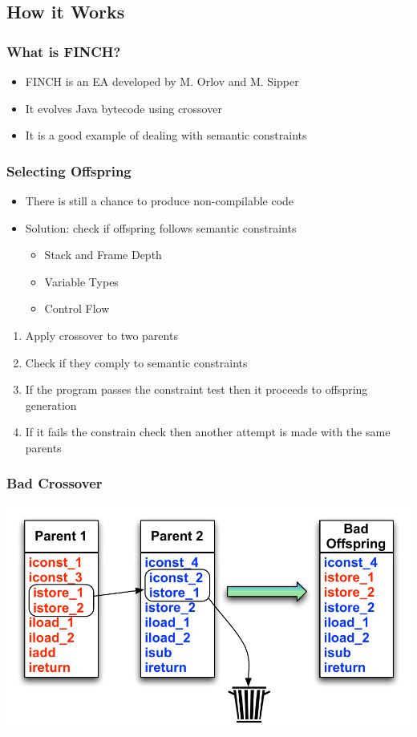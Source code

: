 \documentclass{beamer}
\begin{document}
\subsection[How it works]{How it Works}
\begin{frame}
	\frametitle{What is FINCH?}
	\begin{itemize}
		\item FINCH is an EA developed by M. Orlov and M. Sipper	
		\item It evolves Java bytecode using crossover
		\item It is a good example of dealing with semantic constraints
	\end{itemize}
\end{frame}

\begin{frame}
  \frametitle{Selecting Offspring}

  \begin{itemize}
  	\item There is still a chance to produce non-compilable code
	\item Solution: check if offspring follows semantic constraints
	\begin{itemize}
	\item Stack and Frame Depth
	\item Variable Types
	\item Control Flow
	\end{itemize}

  \end{itemize}
\end{frame}

\begin{frame}
\begin{enumerate}
\item Apply crossover to two parents
\item Check if they comply to semantic constraints
\item If the program passes the constraint test then it proceeds to offspring generation
\item If it fails the constrain check then another attempt is made with the same parents
\end{enumerate}

\end{frame}

\begin{frame}
  \frametitle{Bad Crossover}
  \includegraphics[height=.5\textheight]{Illustrations/badCrossover.pdf}
\end{frame}
\end{document}
